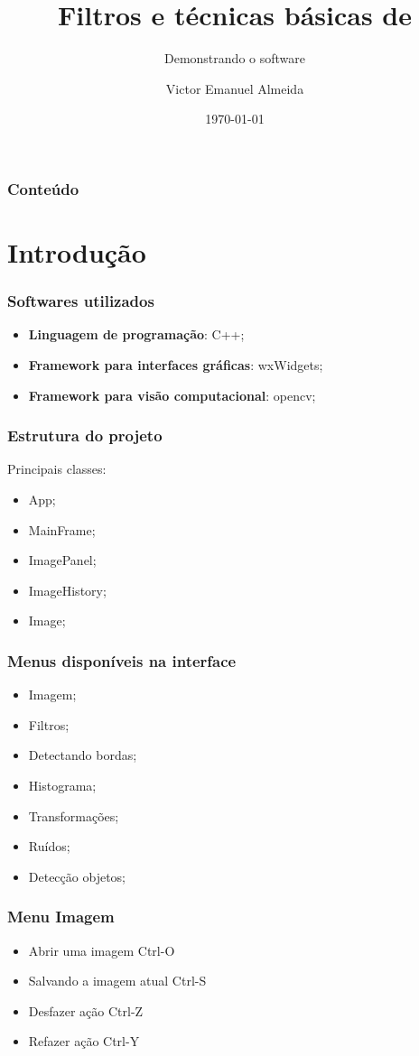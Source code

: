 \documentclass[12pt]{beamer}
\author[Aluno:~Victor E. Almeida]{Victor Emanuel Almeida}
\title{Filtros e técnicas básicas de \materia}
\subtitle{Demonstrando o software}
\date{\today}
\institute{UNIOESTE}
\begin{document}
\frame{\titlepage}

\begin{frame}
\frametitle{Conteúdo}
\tableofcontents
\end{frame}

\section{Introdução}\label{Introdução}
\begin{frame}
    \frametitle{Softwares utilizados}
    \begin{itemize}
    \item\textbf{Linguagem de programação}: C++;
    \item\textbf{Framework para interfaces gráficas}: wxWidgets\cite{docsWx};
    \item\textbf{Framework para visão computacional}: opencv;
    \end{itemize}
\end{frame}

\begin{frame}
    \frametitle{Estrutura do projeto}
    Principais classes:
    \begin{itemize}
        \item App;
        \item MainFrame;
        \item ImagePanel;
        \item ImageHistory;
        \item Image;
    \end{itemize}
\end{frame}

\begin{frame}
    \frametitle{Menus disponíveis na interface}
    \begin{itemize}
        \item Imagem;
        \item Filtros;
        \item Detectando bordas;
        \item Histograma;
        \item Transformações;
        \item Ruídos;
        \item Detecção objetos;
    \end{itemize}
\end{frame}

\begin{frame}
    \frametitle{Menu Imagem}
    \begin{itemize}
        \item Abrir uma imagem Ctrl-O
        \item Salvando a imagem atual Ctrl-S
        \item Desfazer ação Ctrl-Z
        \item Refazer ação Ctrl-Y
    \end{itemize}
\end{frame}
\end{document}
